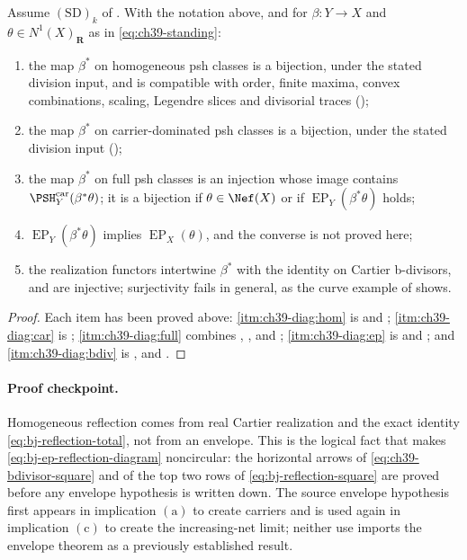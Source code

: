 \begin{proposition}
\label{prop:ch39-diagram}
Assume $\mathrm{(SD)}_k$ of .
With the notation above, and for $\beta:Y\to X$ and
$\theta\in N^1(X)_{\mathbf R}$ as in \eqref{eq:ch39-standing}:
\begin{enumerate}
\item\label{itm:ch39-diag:hom} the map $\beta^*$ on homogeneous psh
 classes is a bijection, under the stated division input, and is compatible with order,
 finite maxima, convex combinations, scaling, Legendre slices and
 divisorial traces
 ();
\item\label{itm:ch39-diag:car} the map $\beta^*$ on carrier-dominated psh
 classes is a bijection, under the stated division input
 ();
\item\label{itm:ch39-diag:full} the map $\beta^*$ on full psh classes is
 an injection whose image contains
 $\PSH^{\mathrm{car}}_Y(\beta^*\theta)$; it is a bijection if
 $\theta\in\Nef(X)$ or if $\operatorname{EP}_Y(\beta^*\theta)$ holds;
\item\label{itm:ch39-diag:ep} $\operatorname{EP}_Y(\beta^*\theta)$
 implies $\operatorname{EP}_X(\theta)$, and the converse is not proved
 here;
\item\label{itm:ch39-diag:bdiv} the realization functors intertwine
 $\beta^*$ with the identity on Cartier b-divisors, and are injective; surjectivity fails in general, as the curve example
 of  shows.
\end{enumerate}
\end{proposition}

\begin{proof}
Each item has been proved above:
\cref{itm:ch39-diag:hom} is  and
; \cref{itm:ch39-diag:car} is
; \cref{itm:ch39-diag:full} combines
, ,
 and
; \cref{itm:ch39-diag:ep} is
 and ; and
\cref{itm:ch39-diag:bdiv} is ,
 and
.
\end{proof}

\paragraph{Proof checkpoint.}
Homogeneous reflection comes from real Cartier realization and the exact
identity \eqref{eq:bj-reflection-total}, not from an envelope.  This is the
logical fact that makes \eqref{eq:bj-ep-reflection-diagram} noncircular: the
horizontal arrows of \eqref{eq:ch39-bdivisor-square} and of the top two rows
of \eqref{eq:bj-reflection-square} are proved before any envelope hypothesis
is written down.  The source envelope hypothesis first appears in
implication $\mathrm{(a)}$ to create carriers and is used again in
implication $\mathrm{(c)}$ to create the increasing-net limit; neither use
imports the envelope theorem as a previously established result.

